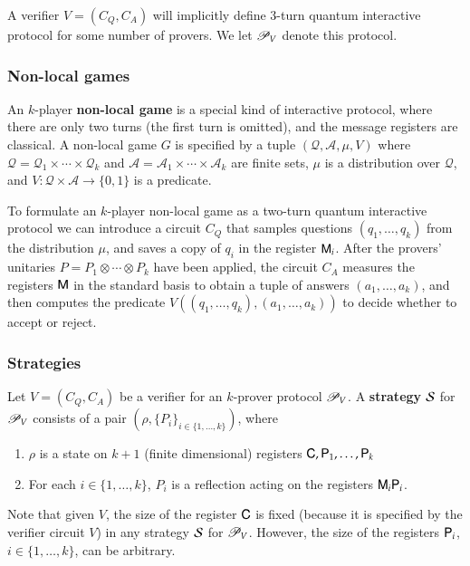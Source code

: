 A verifier $V = (C_Q,C_A)$ will implicitly define $3$-turn quantum interactive protocol for some number of provers. We let $\mathscr{P}_V$ denote this protocol.



\subsubsection{Non-local games} 


An $k$-player \textbf{non-local game} is a special kind of interactive protocol, where there are only two turns (the first turn is omitted), and the message registers are classical. A non-local game $G$ is specified by a tuple $(\mathcal{Q},\mathcal{A},\mu,V)$ where $\mathcal{Q} = \mathcal{Q}_1 \times \cdots \times \mathcal{Q}_k$ and $\mathcal{A} = \mathcal{A}_1 \times \cdots \times \mathcal{A}_k$ are finite sets, $\mu$ is a distribution over $\mathcal{Q}$, and $V: \mathcal{Q} \times \mathcal{A} \to \{0,1\}$ is a predicate. 


To formulate an $k$-player non-local game as a two-turn quantum interactive protocol we can introduce a circuit $C_Q$ that samples questions $(q_1,\ldots,q_k)$ from the distribution $\mu$, and saves a copy of $q_i$ in the register ${\mathsf{M}}_i$. After the provers' unitaries $P = P_1 \otimes \cdots \otimes P_k$ have been applied, the circuit $C_A$ measures the registers ${\mathsf{M}}$  in the standard basis to obtain a tuple of answers $(a_1,\ldots,a_k)$, and then computes the predicate $V((q_1,\ldots,q_k),(a_1,\ldots,a_k))$ to decide whether to accept or reject.


\subsubsection{Strategies}

Let $V = (C_Q,C_A)$ be a verifier for an $k$-prover protocol $\mathscr{P}_V$. A \textbf{strategy} $\mathcal{S}$ for $\mathscr{P}_V$ consists of a pair $(\rho,\{P_i\}_{i\in\{1,\ldots,k\}})$, where
\begin{enumerate}
	\item $\rho$ is a state on $k+1$ (finite dimensional) registers ${\mathsf{C}}, {\mathsf{P}}_1, \ldots, {\mathsf{P}}_k$
	\item For each $i\in\{1,\ldots,k\}$, $P_i$ is a reflection acting on the registers ${\mathsf{M}}_i {\mathsf{P}}_i$.
\end{enumerate}
Note that given $V$, the size of the register ${\mathsf{C}}$ is fixed (because it is specified by the verifier circuit $V$) in any strategy $\mathcal{S}$ for $\mathscr{P}_V$. However, the size of the registers ${\mathsf{P}}_i$, $i\in\{1,\ldots,k\}$, can be arbitrary.

